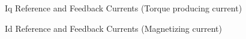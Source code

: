 \begin{frame}{Iq Reference and Feedback Currents (Torque producing current)}
	\begin{figure}
		\centering


	\end{figure}
\end{frame}

\begin{frame}{Id Reference and Feedback Currents (Magnetizing current)}
	\begin{figure}
		\centering


	\end{figure}
\end{frame}

